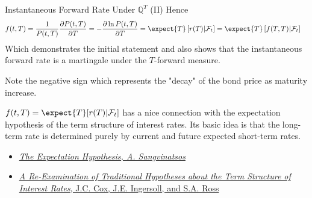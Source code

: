 \documentclass{beamer}
\begin{document}
	\begin{frame}{Instantaneous Forward Rate Under $\mathbb{Q}^T$ (II)}
		Hence
		\begin{equation*}
			\begin{aligned}
				f(t,T)&=\frac{1}{P(t,T)}\frac{\partial P(t,T)}{\partial T}=
				-\frac{\partial \ln P(t,T)}{\partial T}
				= \expect{T}\left[r(T)|\mathcal{F}_t\right]=	\expect{T}\left[f(T,T)|\mathcal{F}_t\right]
			\end{aligned}
		\end{equation*}
		Which demonstrates the initial statement and also shows that \textcolor{maincolor}{the instantaneous forward rate is a martingale under the $T$-forward measure}.
		\myendproof

		Note the negative sign which represents the "decay" of the bond
		price as maturity increase.

		\begin{tcolorbox}[colback=gray!5, colframe=maincolor, arc=0mm, boxrule=0.5pt]
			\footnotesize
			$f(t, T) = \expect{T}[r(T)|\mathcal{F}_t]$ has a nice connection with the \textcolor{maincolor}{expectation hypothesis of the term structure of interest rates}.
			Its basic idea is that the long-term rate is determined purely by current and future expected short-term rates.
			\begin{itemize}
				\item \href{https://pages.stern.nyu.edu/~sternfin/asangvin/ExpHyp.pdf}{\emph{The Expectation Hypothesis, A. Sangvinatsos}}
				\item \href{https://www.jstor.org/stable/2327547}{\emph{A Re-Examination of Traditional Hypotheses about the Term Structure of Interest Rates}, J.C. Cox, J.E. Ingersoll, and S.A. Ross}
			\end{itemize}
		\end{tcolorbox}
	\end{frame}
\end{document}
